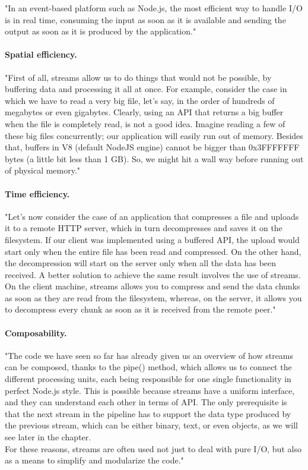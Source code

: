 "In an event-based platform such as Node.js, the most efficient way to handle I/O is in real time, consuming the input as soon as it is available and sending the output as soon as it is produced by the application."\cite{nodejsbook}

\paragraph{Spatial efficiency.}
"First of all, streams allow us to do things that would not be possible, by buffering data and processing it all at once. For example, consider the case in which we have to read a very big file, let's say, in the order of hundreds of megabytes or even gigabytes. 
Clearly, using an API that returns a big buffer when the file is completely read, is not a good idea.
Imagine reading a few of these big files concurrently; our application will easily run out of memory. Besides that, buffers in V8 (default NodeJS engine) cannot be bigger than 0x3FFFFFFF bytes (a little bit less than 1 GB). 
So, we might hit a wall way before running out of physical memory." \cite{nodejsbook}

\paragraph{Time efficiency.}
"Let's now consider the case of an application that compresses a file and uploads it to a remote HTTP server, which in turn decompresses and saves it on the filesystem.
If our client was implemented using a buffered API, the upload would start only when the entire file has been read and compressed. On the other hand, the decompression will start on the server only when all the data has been received. 
A better solution to achieve the same result involves the use of streams. 
On the client machine, streams allows you to compress and send the data chunks as soon as they are read from the filesystem, whereas, on the server, it allows you to decompress every chunk as soon as it is received from the remote peer."\cite{nodejsbook}

\paragraph{Composability.}
"The code we have seen so far has already given us an overview of how streams can be composed, thanks to the pipe() method, which allows us to connect the different processing units, each being responsible for one single functionality in perfect Node.js style. 
This is possible because streams have a uniform interface, and they can understand each other in terms of API. The only prerequisite is that the next stream in the pipeline has to support the data type produced by the previous stream, which can be either binary, text, or even objects, as we will see later in the chapter.\\
For these reasons, streams are often used not just to deal with pure I/O, but also as a means to simplify and modularize the code."\cite{nodejsbook}

